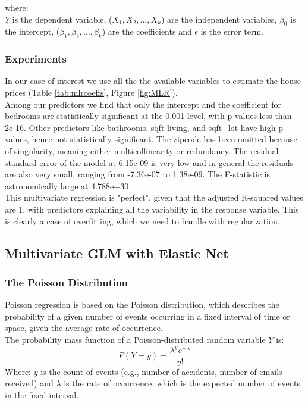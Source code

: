\documentclass[a4paper, 12pt]{article}
\begin{document}
\begin{multicols}{2}
where: \\ $Y$ is the dependent variable, ($X_1, X_2,\dots,X_k$) are the independent variables, $\beta_0$ is the intercept, ($\beta_1,\beta_2, \dots, \beta_k$) are the coefficients and $\epsilon$ is the error term.\\
\subsubsection*{Experiments}
In our case of interest we use all the the available variables to estimate the house prices (Table \ref{tab:mlrcoeffs}, Figure \ref{fig:MLR}).\\
Among our predictors we find that only the intercept and the coefficient for bedrooms are statistically significant at the 0.001 level, with p-values less than 2e-16. Other predictors like bathrooms, sqft$\_$living, and sqft{\_}lot have high p-values, hence not statistically significant. The zipcode has been omitted because of singularity, meaning either multicollinearity or redundancy. The residual standard error of the model at 6.15e-09 is very low and in general the residuals are also very small, ranging from -7.36e-07 to 1.38e-09. The F-statistic is astronomically large at 4.788e+30.\\
This multivariate regression is "perfect", given that the adjusted R-squared values are 1, with predictors explaining all the variability in the response variable. This is clearly a case of overfitting, which we need to handle with regularization.


\subsection{Multivariate GLM with Elastic Net} \vspace{-3pt}
\subsubsection*{The Poisson Distribution}
Poisson regression is based on the Poisson distribution, which describes the probability of a given number of events occurring in a fixed interval of time or space, given the average rate of occurrence.\\
The probability mass function of a Poisson-distributed random variable $Y$ is:
\begin{equation}
P(Y=y)= \frac{\lambda^ye^{-\lambda}}{y!}
\end{equation}
Where: $y$ is the count of events (e.g., number of accidents, number of emails received) and $\lambda$ is the rate of occurrence, which is the expected number of events in the fixed interval.

\end{multicols}
\end{document}
